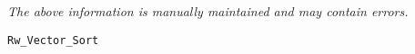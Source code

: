 \label{pkg:rw\_vector\_quicksort}

{\tiny \it The above information is manually maintained and may contain errors.}
\begin{verbatim}
Rw_Vector_Sort
\end{verbatim}
